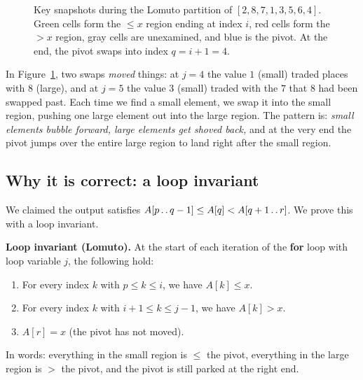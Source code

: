 \begin{figure}[h]
\caption{Key snapshots during the Lomuto partition of $[2, 8, 7, 1, 3, 5, 6, 4]$. Green cells form the $\le x$ region ending at index $i$, red cells form the $> x$ region, gray cells are unexamined, and blue is the pivot. At the end, the pivot swaps into index $q=i+1=4$.}
\label{ch07:fig-lomuto-trace}
\end{figure}

In Figure~\ref{ch07:fig-lomuto-trace}, two swaps \emph{moved} things: at $j=4$ the value $1$
(small) traded places with $8$ (large), and at $j=5$ the value $3$ (small)
traded with the $7$ that $8$ had been swapped past. Each time we find a small
element, we swap it into the small region, pushing one large element out into
the large region. The pattern is: \emph{small elements bubble forward, large
elements get shoved back,} and at the very end the pivot jumps over the entire
large region to land right after the small region.

\subsection{Why it is correct: a loop invariant}

We claimed the output satisfies $A[p \mathinner{\ldotp\ldotp} q-1] \le A[q] < A[q+1 \mathinner{\ldotp\ldotp} r]$. We prove this with a loop invariant.

\begin{formalbox}
\textbf{Loop invariant (Lomuto).} At the start of each iteration of the
\textbf{for} loop with loop variable $j$, the following hold:
\begin{enumerate}
\item For every index $k$ with $p \le k \le i$, we have $A[k] \le x$.
\item For every index $k$ with $i+1 \le k \le j-1$, we have $A[k] > x$.
\item $A[r] = x$ (the pivot has not moved).
\end{enumerate}
In words: everything in the small region is $\le$ the pivot, everything in the
large region is $>$ the pivot, and the pivot is still parked at the right end.
\end{formalbox}

